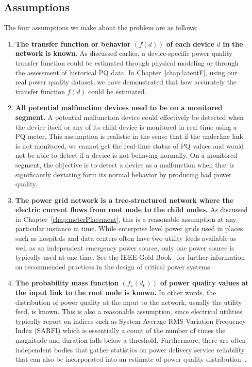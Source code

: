 \subsection{Assumptions}
The four assumptions we make about the problem are as follows:
\begin{enumerate}
\item \textbf{The transfer function or behavior $\left(f\left(d\right)\right)$ of each device $d$ in the network is known}. As discussed earlier, a device-specific power quality transfer function could be estimated through physical modeling or through the assessment of historical PQ data. In Chapter~\ref{chap:latentF}, using our real power quality dataset, we have demonstrated that how accurately the transfer function $f(d)$ could be estimated.

\item \textbf{All potential malfunction devices need to be on a monitored segment.} A potential malfunction device could effectively be detected when the device itself or any of its child device is monitored in real time using a PQ meter. This assumption is realistic in the sense that if the underline link is not monitored, we cannot get the real-time status of PQ values and would not be able to detect if a device is not behaving normally. On a monitored segment, the objective is to detect a device as a malfunction when that is significantly deviating form its normal behavior by producing bad power quality.

\item \textbf{The power grid network is a tree-structured network where the electric current flows from root node to the child nodes.} As discussed in Chapter~\ref{chap:meterPlacement}, this is a reasonable assumption at any particular instance in time. While enterprise level power grids used in places such as hospitals and data centers often have two utility feeds available as well as an independent emergency power source, only one power source is typically used at one time. See the IEEE Gold Book~\cite{goldbook} for further information on recommended practices in the design of critical power systems.

\item \textbf{The probability mass function $(f_x\left(d_0\right))$ of power quality values at the input link to the root node is known.} In other words, the distribution of power quality at the input to the network, usually the utility feed, is known. This is also a reasonable assumption, since electrical utilities typically report on indices such as System Average RMS Variation Frequency Index (SARFI) which is essentially a count of the number of times the magnitude and duration falls below a threshold. Furthermore, there are often independent bodies that gather statistics on power delivery service reliability that can also be incorporated into an estimate of power quality distribution~\cite{chowdhury2004reliability}.
\end{enumerate}


